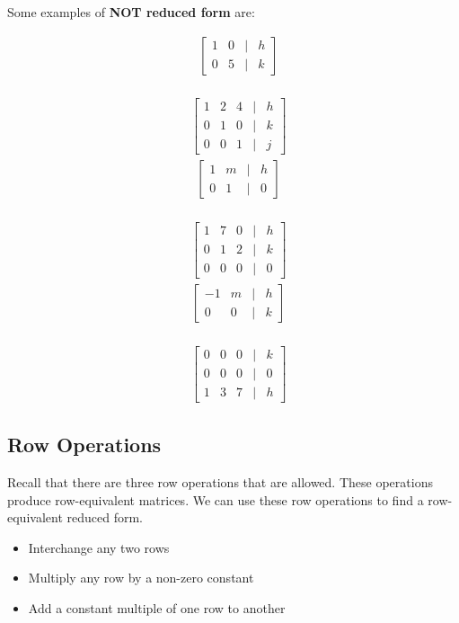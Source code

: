 \documentclass[14pt]{extarticle}
\begin{document}
Some examples of \textbf{NOT reduced form} are:
\begin{multicols}{3}
	\begin{align*}
		&\begin{bmatrix}
			1 & 0 & | & h\\
			0 & 5 & | & k
		\end{bmatrix} 
	\end{align*}
	\\
	\begin{align*}
		&\begin{bmatrix}
			1 & 2 & 4 & | & h\\
			0 & 1 & 0 & | & k \\
			0 & 0 & 1 & | & j
		\end{bmatrix} 
	\end{align*}
	\vfill\null
	\columnbreak
	\begin{align*}
		&\begin{bmatrix}
			1 & m & | & h\\
			0 & 1 & | & 0
		\end{bmatrix} 
	\end{align*}
	\\
	\begin{align*}
		&\begin{bmatrix}
			1 & 7 & 0 & | & h\\
			0 & 1 & 2 & | & k \\
			0 & 0 & 0 & | & 0
		\end{bmatrix} 
	\end{align*}
	\vfill\null
	\columnbreak
	\begin{align*}
		&\begin{bmatrix}
			-1 & m & | & h\\
			0 & 0 & | & k
		\end{bmatrix} 
	\end{align*}
	\\
	\begin{align*}
		&\begin{bmatrix}
			0 & 0 & 0 & | & k \\
			0 & 0 & 0 & | & 0 \\
			1 & 3 & 7 & | & h
		\end{bmatrix} 
	\end{align*}
	\vfill\null
\end{multicols}

\subsection*{Row Operations}
Recall that there are three row operations that are allowed. These operations produce row-equivalent matrices. We can use these row operations to find a row-equivalent reduced form.
\begin{itemize}
	\item Interchange any two rows
	\item Multiply any row by a non-zero constant
	\item Add a constant multiple of one row to another
\end{itemize}
\end{document}
